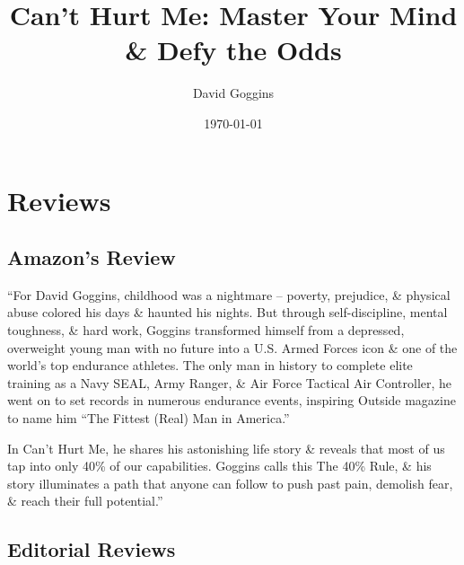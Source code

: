 \documentclass{article}
\title{Can't Hurt Me: Master Your Mind \& Defy the Odds}
\author{David Goggins}
\date{\today}
\numberwithin{equation}{section}
\begin{document}
\maketitle
\tableofcontents


\section{Reviews}

\subsection{Amazon's Review}
``For David Goggins, childhood was a nightmare -- poverty, prejudice, \& physical abuse colored his days \& haunted his nights. But through self-discipline, mental toughness, \& hard work, Goggins transformed himself from a depressed, overweight young man with no future into a U.S. Armed Forces icon \& one of the world's top endurance athletes. The only man in history to complete elite training as a Navy SEAL, Army Ranger, \& Air Force Tactical Air Controller, he went on to set records in numerous endurance events, inspiring Outside magazine to name him ``The Fittest (Real) Man in America.''

In Can't Hurt Me, he shares his astonishing life story \& reveals that most of us tap into only 40\% of our capabilities. Goggins calls this The 40\% Rule, \& his story illuminates a path that anyone can follow to push past pain, demolish fear, \& reach their full potential.''

\subsection{Editorial Reviews}

\end{document}
